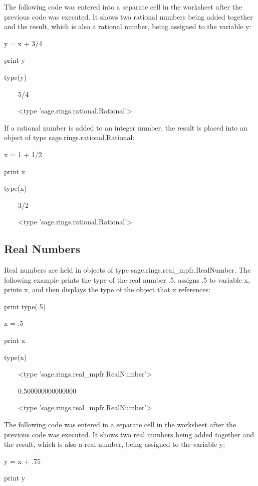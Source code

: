\documentclass[12pt,oneside]{book}
\begin{document}
The following code was entered into a separate cell in the worksheet after the previous code was executed. It shows two rational numbers being added together and the result, which is also a rational number, being assigned to the variable y:

y = x + 3/4

print y

type(y)

{\textbar}

\ \ \ \ 5/4

\ \ \ \ {\textless}type 'sage.rings.rational.Rational'{\textgreater}

If a rational number is added to an integer number, the result is placed into an object of type sage.rings.rational.Rational:


x = 1 + 1/2

print x

type(x)

{\textbar}

\ \ \ \ 3/2

\ \ \ \ {\textless}type 'sage.rings.rational.Rational'{\textgreater}

\subsection[Real Numbers]{Real Numbers}

Real numbers are held in objects of type sage.rings.real\_mpfr.RealNumber. The following example prints the type of the real number .5, assigns .5 to variable x, prints x, and then displays the type of the object that x references:

print type(.5)

x = .5

print x

type(x)

{\textbar}

\ \ \ \ {\textless}type 'sage.rings.real\_mpfr.RealNumber'{\textgreater}

\ \ \ \ 0.500000000000000

\ \ \ \ {\textless}type 'sage.rings.real\_mpfr.RealNumber'{\textgreater}

The following code was entered in a separate cell in the worksheet after the previous code was executed. It shows two real numbers being added together and the result, which is also a real number, being assigned to the variable y:

y = x + .75

print y
\end{document}

